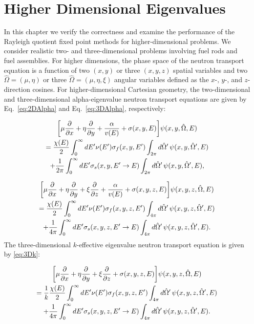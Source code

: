 \chapter{Higher Dimensional Eigenvalues}

In this chapter we verify the correctness and examine the performance of the Rayleigh quotient fixed point methods for higher-dimensional problems. We consider realistic two- and three-dimensional problems involving fuel rods and fuel assemblies. For higher dimensions, the phase space of the neutron transport equation is a function of two $(x, y)$ or three $(x, y, z)$ spatial variables and two $\hat{\Omega} = (\mu, \eta)$ or three $\hat{\Omega} =  (\mu, \eta, \xi)$ angular variables defined as the $x$-, $y$-, and $z$-direction cosines. For higher-dimensional Cartesian geometry, the two-dimensional and three-dimensional alpha-eigenvalue neutron transport equations are given by Eq.~\ref{eq:2DAlpha} and Eq.~\ref{eq:3DAlpha}, respectively:

\begin{multline}
\bigg [ \mu \frac{\partial}{\partial x} + \eta \frac{\partial}{\partial y} + \frac{\alpha}{v(E)} + \sigma(x,y,E) \bigg ] \psi(x,y,\hat{\Omega},E) \\ = \frac{\chi(E)}{2} \int_{0}^{\infty} \mathop{}\!d E' \nu(E') \sigma_{f}(x,y,E') \int_{2\pi} \mathop{}\!d \hat{\Omega}' \, \psi(x,y, \hat{\Omega}', E) \\ + \frac{1}{2\pi} \int_{0}^{\infty} \mathop{}\!d E' \sigma_{s}(x, y, E' \rightarrow E) \int_{2\pi} \mathop{}\!d \hat{\Omega}' \, \psi(x,y, \hat{\Omega}',E),
\label{eq:2DAlpha}
\end{multline}

\begin{multline}
\bigg [ \mu \frac{\partial}{\partial x} + \eta \frac{\partial}{\partial y} + \xi \frac{\partial}{\partial z} + \frac{\alpha}{v(E)} + \sigma(x,y,z,E) \bigg ] \psi(x,y,z,\hat{\Omega}, E) \\ = \frac{\chi(E)}{2} \int_{0}^{\infty} \mathop{}\!d E' \nu(E') \sigma_{f}(x,y,z,E') \int_{4\pi} \mathop{}\!d \hat{\Omega}' \, \psi(x,y,z, \hat{\Omega}',E) \\ + \frac{1}{4\pi} \int_{0}^{\infty} \mathop{}\!d E' \sigma_{s}(x, y, z, E' \rightarrow E) \int_{4\pi} \mathop{}\!d \hat{\Omega}' \, \psi(x,y,z, \hat{\Omega}',E).
\label{eq:3DAlpha}
\end{multline}
The three-dimensional $k$-effective eigenvalue neutron transport equation is given by \ref{eq:3Dk}:

\begin{multline}
\bigg [ \mu \frac{\partial}{\partial x} + \eta \frac{\partial}{\partial y} + \xi \frac{\partial}{\partial z} + \sigma(x,y,z,E) \bigg ] \psi(x,y,z,\hat{\Omega}, E) \\ = \frac{1}{k}\frac{\chi(E)}{2} \int_{0}^{\infty} \mathop{}\!d E' \nu(E') \sigma_{f}(x,y,z,E') \int_{4\pi} \mathop{}\!d \hat{\Omega}' \, \psi(x,y,z, \hat{\Omega}',E) \\ + \frac{1}{4\pi} \int_{0}^{\infty} \mathop{}\!d E' \sigma_{s}(x, y, z, E' \rightarrow E) \int_{4\pi} \mathop{}\!d \hat{\Omega}' \, \psi(x,y,z, \hat{\Omega}',E).
\label{eq:3Dk}
\end{multline}


